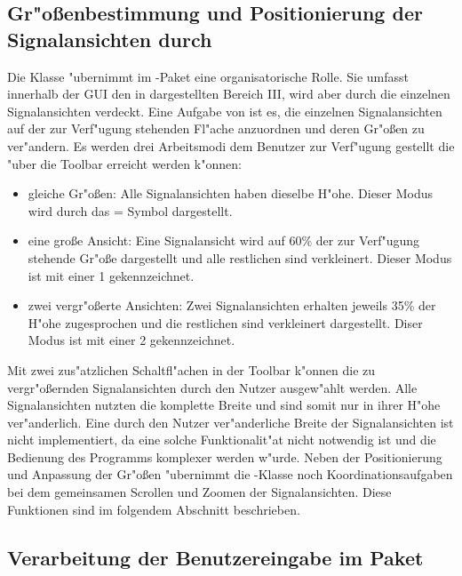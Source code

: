 \subsection{Gr"o{\ss}enbestimmung und Positionierung der Signalansichten durch }
\label{sec:signalpanel_organisation}

Die Klasse  "ubernimmt im -Paket eine organisatorische Rolle.
Sie umfasst innerhalb der \ac{GUI} den in  dargestellten Bereich III, wird aber durch die einzelnen Signalansichten verdeckt.
Eine Aufgabe von  ist es, die einzelnen Signalansichten auf der zur Verf"ugung stehenden Fl"ache anzuordnen und deren Gr"o{\ss}en zu ver"andern.
Es werden drei Arbeitsmodi dem Benutzer zur Verf"ugung gestellt die "uber die Toolbar erreicht werden k"onnen:
\begin{itemize}
	\item gleiche Gr"o{\ss}en: Alle Signalansichten haben dieselbe H"ohe. Dieser Modus wird durch das = Symbol dargestellt.
	\item eine gro{\ss}e Ansicht: Eine Signalansicht wird auf \unit{60}{\%} der zur Verf"ugung stehende Gr"o{\ss}e dargestellt und alle restlichen sind verkleinert. Dieser Modus ist mit einer 1 gekennzeichnet.
	\item zwei vergr"o{\ss}erte Ansichten: Zwei Signalansichten erhalten jeweils \unit{35}{\%} der H"ohe zugesprochen und die restlichen sind verkleinert dargestellt. Diser Modus ist mit einer 2 gekennzeichnet.
\end{itemize}
Mit zwei zus"atzlichen Schaltfl"achen in der Toolbar k"onnen die zu vergr"o{\ss}ernden Signalansichten durch den Nutzer ausgew"ahlt werden.
Alle Signalansichten nutzten die komplette Breite und sind somit nur in ihrer H"ohe ver"anderlich.
Eine durch den Nutzer ver"anderliche Breite der Signalansichten ist nicht implementiert, da eine solche Funktionalit"at nicht notwendig ist und die Bedienung des Programms komplexer werden w"urde.
Neben der Positionierung und Anpassung der Gr"o{\ss}en "ubernimmt die -Klasse noch Koordinationsaufgaben bei dem gemeinsamen Scrollen und Zoomen der Signalansichten.
Diese Funktionen sind im folgendem Abschnitt beschrieben.


\subsection{Verarbeitung der Benutzereingabe im Paket }
\label{sec:userinput}

